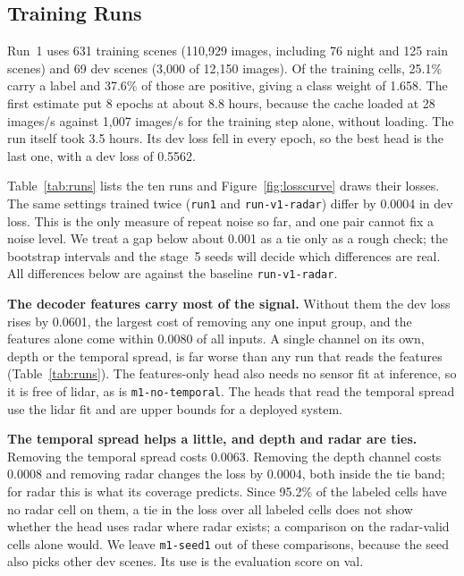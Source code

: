 \subsection{Training Runs}
\label{sec:runs}

Run~1 uses 631 training scenes (110,929 images, including 76 night and 125 rain scenes) and 69 dev scenes (3,000 of 12,150 images). Of the training cells, 25.1\% carry a label and 37.6\% of those are positive, giving a class weight of 1.658. The first estimate put 8 epochs at about 8.8 hours, because the cache loaded at 28 images/s against 1,007 images/s for the training step alone, without loading. The run itself took 3.5 hours. Its dev loss fell in every epoch, so the best head is the last one, with a dev loss of 0.5562.

Table~\ref{tab:runs} lists the ten runs and Figure~\ref{fig:losscurve} draws their losses. The same settings trained twice (\texttt{run1} and \texttt{run-v1-radar}) differ by 0.0004 in dev loss. This is the only measure of repeat noise so far, and one pair cannot fix a noise level. We treat a gap below about 0.001 as a tie only as a rough check; the bootstrap intervals and the stage~5 seeds will decide which differences are real. All differences below are against the baseline \texttt{run-v1-radar}.

\textbf{The decoder features carry most of the signal.} Without them the dev loss rises by 0.0601, the largest cost of removing any one input group, and the features alone come within 0.0080 of all inputs. A single channel on its own, depth or the temporal spread, is far worse than any run that reads the features (Table~\ref{tab:runs}). The features-only head also needs no sensor fit at inference, so it is free of lidar, as is \texttt{m1-no-temporal}. The heads that read the temporal spread use the lidar fit and are upper bounds for a deployed system.

\textbf{The temporal spread helps a little, and depth and radar are ties.} Removing the temporal spread costs 0.0063. Removing the depth channel costs 0.0008 and removing radar changes the loss by 0.0004, both inside the tie band; for radar this is what its coverage predicts. Since 95.2\% of the labeled cells have no radar cell on them, a tie in the loss over all labeled cells does not show whether the head uses radar where radar exists; a comparison on the radar-valid cells alone would. We leave \texttt{m1-seed1} out of these comparisons, because the seed also picks other dev scenes. Its use is the evaluation score on val.

